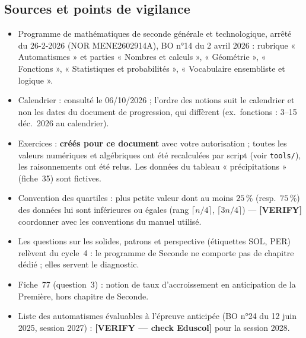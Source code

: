 \subsection*{Sources et points de vigilance}
\begin{itemize}[leftmargin=1.2em,itemsep=2pt]
  \item Programme de mathématiques de seconde générale et technologique, arrêté du 26-2-2026 (NOR MENE2602914A), BO n°14 du 2 avril 2026 : rubrique « Automatismes » et parties « Nombres et calculs », « Géométrie », « Fonctions », « Statistiques et probabilités », « Vocabulaire ensembliste et logique ».
  \item Calendrier : consulté le 06/10/2026 ; l'ordre des notions suit le calendrier et non les dates du document de progression, qui diffèrent (ex.\ fonctions : 3--15 déc.\ 2026 au calendrier).
  \item Exercices : \textbf{créés pour ce document} avec votre autorisation ; toutes les valeurs numériques et algébriques ont été recalculées par script (voir \texttt{tools/}), les raisonnements ont été relus. Les données du tableau « précipitations » (fiche~35) sont fictives.
  \item Convention des quartiles : plus petite valeur dont au moins $25\,\%$ (resp.\ $75\,\%$) des données lui sont inférieures ou égales (rang $\lceil n/4\rceil$, $\lceil3n/4\rceil$) --- \textbf{[VERIFY]} coordonner avec les conventions du manuel utilisé.
  \item Les questions sur les solides, patrons et perspective (étiquettes SOL, PER) relèvent du cycle~4 : le programme de Seconde ne comporte pas de chapitre dédié ; elles servent le diagnostic.
  \item Fiche~77 (question~3) : notion de taux d'accroissement en anticipation de la Première, hors chapitre de Seconde.
  \item Liste des automatismes évaluables à l'épreuve anticipée (BO n°24 du 12 juin 2025, session 2027) : \textbf{[VERIFY --- check Eduscol]} pour la session 2028.
\end{itemize}
